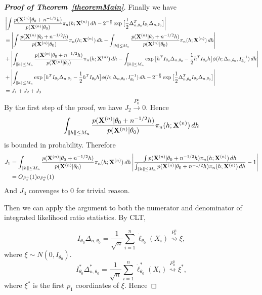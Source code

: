 \documentclass[3p]{elsarticle}
\theoremstyle{plain}
\theoremstyle{definition}
\theoremstyle{remark}
\begin{document}
\begin{appendices}
\begin{proof}[\textbf{Proof of Theorem~\ref{theoremMain}}]
Finally we have
\begin{equation*}
    \begin{aligned}
        &\left|\int \frac{p(\mathbf{X}^{(n)}|\theta_0+n^{-1/2}h)}{p(\mathbf{X}^{(n)}|\theta_0)}\pi_n (h;\mathbf{X}^{(n)}) \, dh-2^{-\frac{p}{2}}\exp\big[\frac{1}{2}\Delta_{n,\theta_0}^T I_{\theta_0}\Delta_{n,\theta_0}\big]
 \right|\\
        &=\left|\int \frac{p(\mathbf{X}^{(n)}|\theta_0+n^{-1/2}h)}{p(\mathbf{X}^{(n)}|\theta_0)}\pi_n (h;\mathbf{X}^{(n)}) \, dh-\int_{\|h\|\leq M_n}\frac{p(\mathbf{X}^{(n)}|\theta_0+n^{-1/2}h)}{p(\mathbf{X}^{(n)}|\theta_0)}\pi_n (h;\mathbf{X}^{(n)}) \, dh\right|\\
        &+\left|\int_{\|h\|\leq M_n} \frac{p(\mathbf{X}^{(n)}|\theta_0+n^{-1/2}h)}{p(\mathbf{X}^{(n)}|\theta_0)}\pi_n (h;\mathbf{X}^{(n)}) \, dh -\int_{\|h\|\leq M_n} \exp\big[h^T I_{\theta_0}\Delta_{n,\theta_0}-\frac{1}{2}h^T I_{\theta_0}h\big]\phi(h;\Delta_{n,\theta_0},I_{\theta_0}^{-1})\, dh\right|\\
        &+\left| \int_{\|h\|\leq M_n} \exp\big[h^T I_{\theta_0}\Delta_{n,\theta_0}-\frac{1}{2}h^T I_{\theta_0}h\big]\phi(h;\Delta_{n,\theta_0},I_{\theta_0}^{-1})\, dh-2^{-\frac{p}{2}}\exp\big[\frac{1}{2}\Delta_{n,\theta_0}^T I_{\theta_0}\Delta_{n,\theta_0}\big]
 \right|\\
        &=J_1+J_2+J_3
\end{aligned}
\end{equation*}
By the first step of the proof, we have $J_2\xrightarrow{P^n_0}0$.
Hence 
$$
\int_{\|h\|\leq M_n} \frac{p(\mathbf{X}^{(n)}|\theta_0+n^{-1/2}h)}{p(\mathbf{X}^{(n)}|\theta_0)}\pi_n (h;\mathbf{X}^{(n)}) \, dh
$$ is bounded in probability. Therefore
\begin{equation*}
\begin{aligned}
    J_1&=
\int_{\|h\|\leq M_n} \frac{p(\mathbf{X}^{(n)}|\theta_0+n^{-1/2}h)}{p(\mathbf{X}^{(n)}|\theta_0)}\pi_n (h;\mathbf{X}^{(n)}) \, dh
\left|\frac{
\int p(\mathbf{X}^{(n)}|\theta_0+n^{-1/2}h)\pi_n (h;\mathbf{X}^{(n)}) \, dh}{\int_{\|h\|\leq M_n} p(\mathbf{X}^{(n)}|\theta_0+n^{-1/2}h)\pi_n (h;\mathbf{X}^{(n)}) \, dh}-1\right|\\
       &=O_{P_0^n}(1)o_{P_0^n}(1)
\end{aligned}
\end{equation*}
And $J_3$ convenges to $0$ for trivial reason.

    Then we can apply the argument to both the numerator and denominator of integrated likelihood ratio statistics. By CLT,

    \begin{equation}
    I_{\theta_0}\Delta_{n,\theta_0}=\frac{1}{\sqrt{n}}\sum^n_{i=1}\dot{\ell}_{\theta_0}(X_i)\overset{P_0^n}{\rightsquigarrow }\xi, 
\end{equation}
where $\xi\sim N(0,I_{\theta_0})$.
\begin{equation}
    I^*_{\theta_0}\Delta^*_{n,\theta_0}=\frac{1}{\sqrt{n}}\sum^n_{i=1}\dot{\ell}^*_{\theta_0}(X_i)\overset{P_0^n}{\rightsquigarrow} \xi^*, 
\end{equation}
where $\xi^*$ is the first $p_1$ coordinates of $\xi$. Hence



\end{proof}
\end{appendices}
\end{document}
